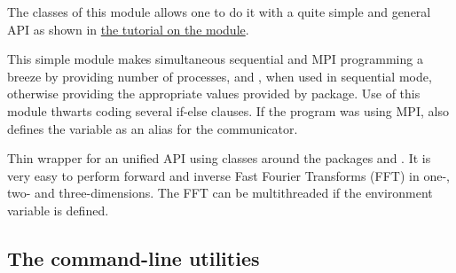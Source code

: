 
The classes of this module allows one to do it with a quite simple and general
API as shown in
\href{http://fluiddyn.readthedocs.io/en/latest/ipynb/tuto_serieofarrays.html}{%
the tutorial on the module}.


This simple module makes simultaneous sequential and MPI programming a breeze
by providing number of processes,  and , when used in sequential mode, otherwise providing the appropriate values
provided by  package. Use of this module thwarts coding several if-else
clauses. If the program was using MPI, also defines the variable
 as an alias for the  communicator.


Thin wrapper for an unified API using classes around the packages 
and .  It is very easy to perform forward and inverse Fast
Fourier Transforms (FFT) in one-, two- and three-dimensions.
The FFT can be multithreaded if the environment variable
 is defined.

\subsection{The \fluiddyn command-line utilities}

